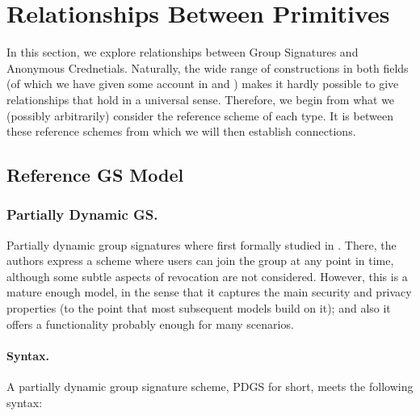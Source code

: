 \section{Relationships Between Primitives}
\label{sec:relationships}


In this section, we explore relationships between Group Signatures and Anonymous
Crednetials. Naturally, the wide range of constructions in both fields (of which
we have given some account in  and ) makes it
hardly possible to give relationships that hold in a universal sense. Therefore,
we begin from what we (possibly arbitrarily) consider the reference scheme of
each type. It is between these reference schemes from which we will then
establish connections.

\subsection{Reference GS Model}
\label{ssec:refgs}

\subsubsection{Partially Dynamic GS.} %
Partially dynamic group signatures where first formally studied in \cite{bsz05}.
There, the authors express a scheme where users can join the group at any point
in time, although some subtle aspects of revocation are not considered. However,
this is a mature enough model, in the sense that it captures the main security
and privacy properties (to the point that most subsequent models build on it);
and also it offers a functionality probably enough for many scenarios.

\paragraph{Syntax.} %
A partially dynamic group signature scheme, PDGS for short, meets the following
syntax:

